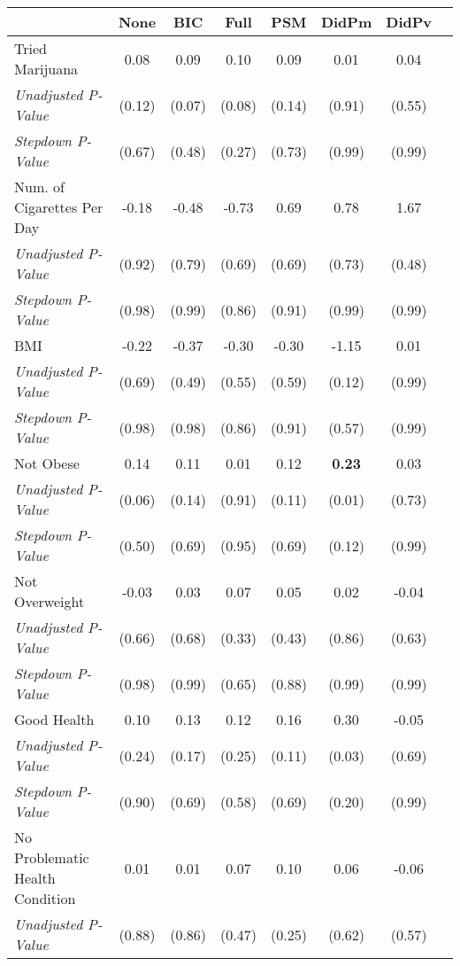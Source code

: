 \begin{tabular}{l c c c c c c c}
\toprule
 & None & BIC & Full & PSM & DidPm & DidPv \\
\midrule
Tried Marijuana & 0.08 & 0.09 & 0.10 & 0.09 & 0.01 & 0.04 \\
\quad \textit{Unadjusted P-Value} & (0.12) & (0.07) & (0.08) & (0.14) & (0.91) & (0.55) \\
\quad \textit{Stepdown P-Value} & (0.67) & (0.48) & (0.27) & (0.73) & (0.99) & (0.99) \\
Num. of Cigarettes Per Day & -0.18 & -0.48 & -0.73 & 0.69 & 0.78 & 1.67 \\
\quad \textit{Unadjusted P-Value} & (0.92) & (0.79) & (0.69) & (0.69) & (0.73) & (0.48) \\
\quad \textit{Stepdown P-Value} & (0.98) & (0.99) & (0.86) & (0.91) & (0.99) & (0.99) \\
BMI & -0.22 & -0.37 & -0.30 & -0.30 & -1.15 & 0.01 \\
\quad \textit{Unadjusted P-Value} & (0.69) & (0.49) & (0.55) & (0.59) & (0.12) & (0.99) \\
\quad \textit{Stepdown P-Value} & (0.98) & (0.98) & (0.86) & (0.91) & (0.57) & (0.99) \\
Not Obese & 0.14 & 0.11 & 0.01 & 0.12 & \textbf{ 0.23 } & 0.03 \\
\quad \textit{Unadjusted P-Value} & (0.06) & (0.14) & (0.91) & (0.11) & (0.01) & (0.73) \\
\quad \textit{Stepdown P-Value} & (0.50) & (0.69) & (0.95) & (0.69) & (0.12) & (0.99) \\
Not Overweight & -0.03 & 0.03 & 0.07 & 0.05 & 0.02 & -0.04 \\
\quad \textit{Unadjusted P-Value} & (0.66) & (0.68) & (0.33) & (0.43) & (0.86) & (0.63) \\
\quad \textit{Stepdown P-Value} & (0.98) & (0.99) & (0.65) & (0.88) & (0.99) & (0.99) \\
Good Health & 0.10 & 0.13 & 0.12 & 0.16 & 0.30 & -0.05 \\
\quad \textit{Unadjusted P-Value} & (0.24) & (0.17) & (0.25) & (0.11) & (0.03) & (0.69) \\
\quad \textit{Stepdown P-Value} & (0.90) & (0.69) & (0.58) & (0.69) & (0.20) & (0.99) \\
No Problematic Health Condition & 0.01 & 0.01 & 0.07 & 0.10 & 0.06 & -0.06 \\
\quad \textit{Unadjusted P-Value} & (0.88) & (0.86) & (0.47) & (0.25) & (0.62) & (0.57) \\

\end{tabular}

